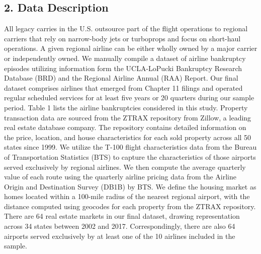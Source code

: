 \documentclass[12pt, letterpaper]{article}
\begin{document}
\subsection*{2. Data Description}
{All legacy carries in the U.S. outsource part of the flight operations to regional carriers that rely on narrow-body jets or turboprops and focus on short-haul operations. A given regional airline can be either wholly owned by a major carrier or independently owned. We manually compile a dataset of airline bankruptcy episodes utilizing information form the UCLA-LoPucki Bankruptcy Research Database (BRD) and the Regional Airline Annual (RAA) Report. Our final dataset comprises airlines that emerged from Chapter 11 filings and operated regular scheduled services for at least five years or 20 quarters during our sample period. Table 1 lists the airline bankruptcies considered in this study.}
{Property transaction data are sourced from the ZTRAX repository from Zillow, a leading real estate database company. The repository contains detailed information on the price, location, and house characteristics for each sold property across all 50 states since 1999. We utilize the T-100 flight characteristics data from the Bureau of Transportation Statistics (BTS) to capture the characteristics of those airports served exclusively by regional airlines. We then compute the average quarterly value of each route using the quarterly airline pricing data from the Airline Origin and Destination Survey (DB1B) by BTS. }
{We define the housing market as homes located within a 100-mile radius of the nearest regional airport, with the distance computed using geocodes for each property from the ZTRAX repository. There are 64 real estate markets in our final dataset, drawing representation across 34 states between 2002 and 2017. Correspondingly, there are also 64 airports served exclusively by at least one of the 10 airlines included in the sample. }\\
\\
\end{document}
